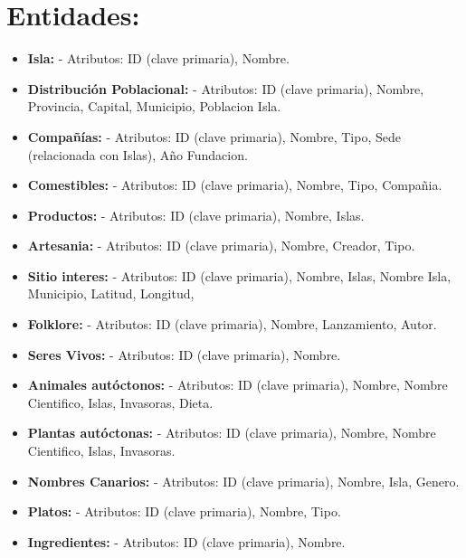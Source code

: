 \documentclass[11pt]{report}
\begin{document}
\section{Entidades:}
\begin{itemize}
      \item \textbf{Isla:}
            \subitem - Atributos: ID (clave primaria), Nombre.

      \item \textbf{Distribución Poblacional:}
            \subitem - Atributos: ID (clave primaria), Nombre, Provincia, Capital, Municipio, Poblacion Isla.

      \item \textbf{Compañías:}
            \subitem - Atributos: ID (clave primaria), Nombre, Tipo, Sede (relacionada con Islas), Año Fundacion.

      \item \textbf{Comestibles:}
            \subitem - Atributos: ID (clave primaria), Nombre, Tipo, Compañia.

      \item \textbf{Productos:}
            \subitem - Atributos: ID (clave primaria), Nombre, Islas.

      \item \textbf{Artesania:}
            \subitem - Atributos: ID (clave primaria), Nombre, Creador, Tipo.

      \item \textbf{Sitio interes:}
            \subitem - Atributos: ID (clave primaria), Nombre, Islas, Nombre Isla, Municipio, Latitud, Longitud,

      \item \textbf{Folklore:}
            \subitem - Atributos: ID (clave primaria), Nombre, Lanzamiento, Autor.

      \item \textbf{Seres Vivos:}
            \subitem - Atributos: ID (clave primaria), Nombre.

      \item \textbf{Animales autóctonos:}
            \subitem - Atributos: ID (clave primaria), Nombre, Nombre Cientifico, Islas, Invasoras, Dieta.

      \item \textbf{Plantas autóctonas:}
            \subitem - Atributos: ID (clave primaria), Nombre, Nombre Cientifico, Islas, Invasoras.

      \item \textbf{Nombres Canarios:}
            \subitem - Atributos: ID (clave primaria), Nombre, Isla, Genero.

      \item \textbf{Platos:}
            \subitem - Atributos: ID (clave primaria), Nombre, Tipo.

      \item \textbf{Ingredientes:}
            \subitem - Atributos: ID (clave primaria), Nombre.
\end{itemize}
\end{document}
